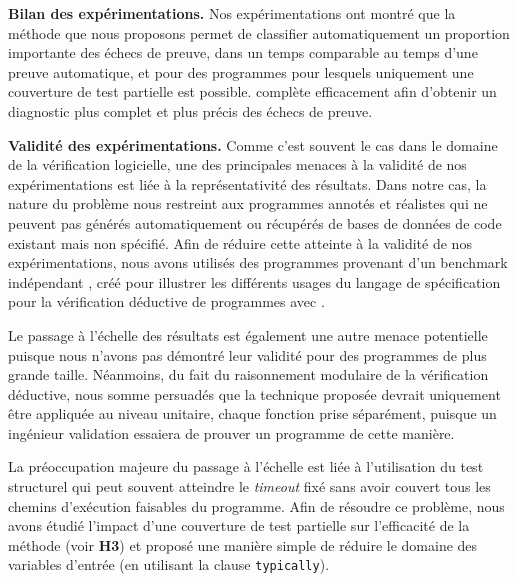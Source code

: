 \textbf{Bilan des expérimentations.}
Nos expérimentations ont montré que la méthode que nous proposons permet de
classifier automatiquement un proportion importante des échecs de preuve, dans
un temps comparable au temps d'une preuve automatique, et pour des programmes
pour lesquels uniquement une couverture de test partielle est possible.
\SWD complète efficacement \NCD afin d'obtenir un diagnostic plus complet et
plus précis des échecs de preuve.

\textbf{Validité des expérimentations.}
Comme c'est souvent le cas dans le domaine de la vérification logicielle, une
des principales menaces à la validité de nos expérimentations est liée à la
représentativité des résultats.%
Dans notre cas, la nature du problème nous restreint aux programmes annotés
et réalistes qui ne peuvent pas générés automatiquement ou récupérés de bases
de données de code existant mais non spécifié.
Afin de réduire cette atteinte à la validité de nos expérimentations, nous
avons utilisés des programmes provenant d'un benchmark indépendant
\cite{ACSLbyExample}, créé pour illustrer les différents usages du langage de
spécification \acsl pour la vérification déductive de programmes avec \framac.

Le passage à l'échelle des résultats est également une autre menace potentielle
puisque nous n'avons pas démontré leur validité pour des programmes de plus
grande taille.
Néanmoins, du fait du raisonnement modulaire de la vérification déductive, nous
somme persuadés que la technique proposée devrait uniquement être appliquée au
niveau unitaire, chaque fonction prise séparément, puisque un ingénieur
validation essaiera de prouver un programme de cette manière.

La préoccupation majeure du passage à l'échelle est liée à l'utilisation du
test structurel qui peut souvent atteindre le {\em timeout} fixé sans avoir
couvert tous les chemins d'exécution faisables du programme.
Afin de résoudre ce problème, nous avons étudié l'impact d'une couverture de
test partielle sur l'efficacité de la méthode (voir \textbf{H3}) et proposé une
manière simple de réduire le domaine des variables d'entrée (en utilisant la
clause \lstinline'typically').

